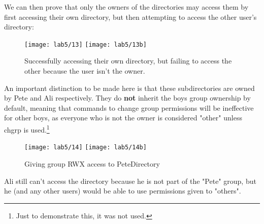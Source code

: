 We can then prove that only the owners of the directories may access them by first accessing their
own directory, but then attempting to access the other user's directory:

\begin{figure}[H]
    \centering
    \texttt{[image: lab5/13]}
    \texttt{[image: lab5/13b]}
    \caption{Successfully accessing their own directory,
        but failing to access the other because the user isn't the owner.}
    \label{fig:PeteAliDirFail}
\end{figure}

An important distinction to be made here is that these subdirectories are owned by Pete and
Ali respectively.
They do \textbf{not} inherit the boys group ownership by default, meaning that commands to
change group permissions will be ineffective for other boys, as everyone who is not the owner
is considered "other" unless chgrp is used.\footnote{Just to demonstrate this, it was not used.}

\begin{figure}[H]
    \centering
    \texttt{[image: lab5/14]}
    \texttt{[image: lab5/14b]}
    \caption{Giving group RWX access to PeteDirectory}
    \label{fig:PeteDirFail}
\end{figure}

Ali still can't access the directory because he is not part of the "Pete" group, but he
(and any other users) would be able to use permissions given to "others".







